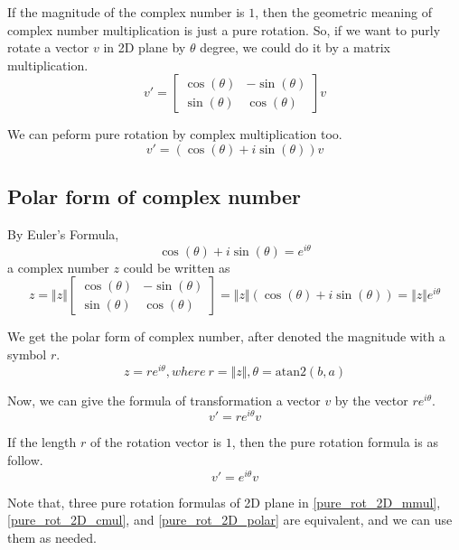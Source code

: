 \documentclass[runningheads,a4paper,english]{llncs}[2022/01/12]
\newcommand{\Clen}[1]{\Vert #1\Vert}
\newcommand{\bmatL}{\begin{bmatrix}}
\newcommand{\bmatR}{\end{bmatrix}}
\begin{document}
If the magnitude of the complex number is $1$, then the geometric meaning of complex number multiplication is just a pure rotation.
So, if we want to purly rotate a vector $v$ in 2D plane by $\theta$ degree, we could do it by a matrix multiplication.
\begin{equation}\label{pure_rot_2D_mmul}
  v'= \bmatL \cos(\theta)&-\sin(\theta)\\\sin(\theta)&\cos(\theta)\bmatR v
\end{equation}

We can peform pure rotation by complex multiplication too.
\begin{equation}\label{pure_rot_2D_cmul}
  v'= (\cos(\theta)+i\sin(\theta))v
\end{equation}

\subsection{Polar form of complex number}

By Euler's Formula,
\begin{equation}
  \cos(\theta)+i\sin(\theta)=e^{i\theta}
\end{equation}
a complex number $z$ could be written as
\begin{equation}
  z=\Clen{z}\bmatL \cos(\theta)&-\sin(\theta)\\\sin(\theta)&\cos(\theta)\bmatR
  =\Clen{z}(\cos(\theta)+i\sin(\theta))=\Clen{z}e^{i\theta}
\end{equation}

We get the polar form of complex number, after denoted the magnitude with a symbol $r$.
\begin{equation}
  z=re^{i\theta}, where~r=\Clen{z},\theta=\mathrm{atan2}(b,a)
\end{equation}

Now, we can give the formula of transformation a vector $v$ by the vector $re^{i\theta}$.
\begin{equation}
  v'=re^{i\theta}v
\end{equation}

If the length $r$ of the rotation vector is $1$, then the pure rotation formula is as follow.
\begin{equation}\label{pure_rot_2D_polar}
  v'=e^{i\theta}v
\end{equation}

Note that, three pure rotation formulas of 2D plane in \eqref{pure_rot_2D_mmul}, \eqref{pure_rot_2D_cmul}, and \eqref{pure_rot_2D_polar} are equivalent, and we can use them as needed.
\end{document}

